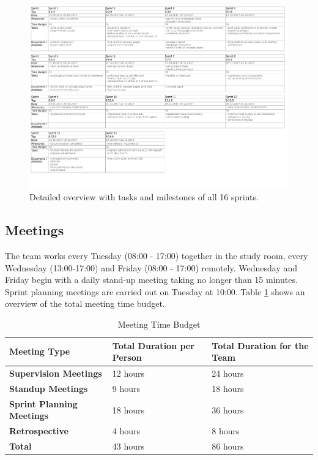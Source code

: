 \begin{figure}[h]
    \begin{sideways}
    \includegraphics[scale=0.75]{resources/sprint_details}
    \end{sideways}
    \centering
    \caption{Detailed overview with tasks and milestones of all 16 sprints.}
    \label{fig:sprint-details}
\end{figure}


\subsection{Meetings}

The team works every Tuesday (08:00 - 17:00) together in the study room, every Wednesday (13:00-17:00) and Friday (08:00 - 17:00) remotely. Wednesday and Friday begin with a daily stand-up meeting taking no longer than 15 minutes. Sprint planning meetings are carried out on Tuesday at 10:00. Table \ref{meeting-time-budget} shows an overview of the total meeting time budget.

\begin{table}[]
    \centering
    \caption{Meeting Time Budget}
    \label{meeting-time-budget}
    \begin{tabular}{lll}
        \hline
        \textbf{Meeting Type}             & \textbf{Total Duration per Person} & \textbf{Total Duration for the Team} \\ \hline
        \textbf{Supervision Meetings}     & 12 hours                           & 24 hours                             \\
        \textbf{Standup Meetings}         & 9 hours                            & 18 hours                             \\
        \textbf{Sprint Planning Meetings} & 18 hours                           & 36 hours                             \\
        \textbf{Retrospective}            & 4 hours                            & 8 hours                              \\ \hline
        \textbf{Total}                    & 43 hours                           & 86 hours
    \end{tabular}
\end{table}

